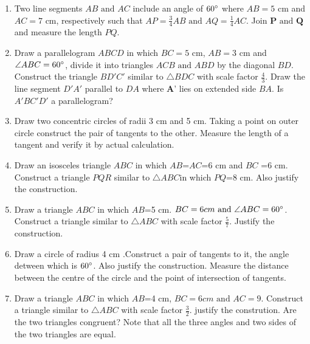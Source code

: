 \documentclass[12pt]{article}
\let\vec\mathbf
\begin{document}
		\begin{enumerate}
\item Two line segments ${AB}\text{ and }{AC}$ include an angle of $60\degree$ where $AB=5$ cm and $AC=7$ cm, respectively such that $AP=\frac{3}{4}AB\text{ and }AQ=\frac{1}{4}AC$. Join $\vec{P}\text{ and }\vec{Q}$ and measure the length $PQ$.
\item Draw a parallelogram ${ABCD}$ in which $BC=5$ cm, $AB=3$ cm and $\angle{ABC}=60\degree$, divide it into triangles ${ACB}\text{ and }{ABD}$ by the diagonal $BD$. 
Construct the triangle $BD'C'$ similar to $\triangle{BDC}$ with scale factor $\frac{4}{3}$. Draw the line segment $D'A'$ parallel to $DA$ where $\vec{A}$' lies on extended side $BA$. Is $A'BC'D'$ a parallelogram? 
\item Draw two concentric circles of radii 3 cm and 5 cm. Taking a point on outer circle construct the pair of tangents to the other. Measure the length of a tangent and verify it by actual calculation.
\item Draw an isosceles triangle ${ABC}$ in which $AB$=$AC$=6 cm and $BC$ =6 cm. Construct a triangle $PQR$ similar to $\triangle{ABC}$in which $PQ$=8 cm. Also justify the construction.
\item Draw a triangle ${ABC}$ in which $AB$=5 cm. $BC=6 cm\text{ and }\angle {ABC}=60\degree$. Construct a triangle similar to $\triangle{ABC}$ with scale factor $\frac{5}{7}$. Justify the construction.
\item Draw a circle of radius 4 cm .Construct a pair of tangents to it, the angle detween which is $60\degree$. Also justify the construction. Measure the distance between the centre of the circle and the point of intersection of tangents.
\item Draw a triangle ${ABC}$ in which $AB$=4 cm, $BC=6 cm\text{ and }AC=9$. Construct a triangle similar to $\triangle{ABC}$ with scale factor $\frac{3}{2}$. justify the constrution. Are the two triangles congruent? Note that all the three angles and two sides of the two triangles are equal.

\end{enumerate}
\end{document}
